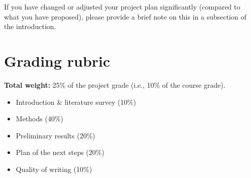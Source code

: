 If you have changed or adjusted your project plan significantly (compared to what you have proposed), please provide a brief note on this in a subsection of the introduction.

\section*{Grading rubric}

\textbf{Total weight:} 25\% of the project grade (i.e., 10\% of the course grade).

\begin{itemize}[leftmargin=2em]
    \item Introduction \& literature survey (10\%)
    \item Methods (40\%)
    \item Preliminary results (20\%)
    \item Plan of the next steps (20\%)
    \item Quality of writing (10\%)
\end{itemize}